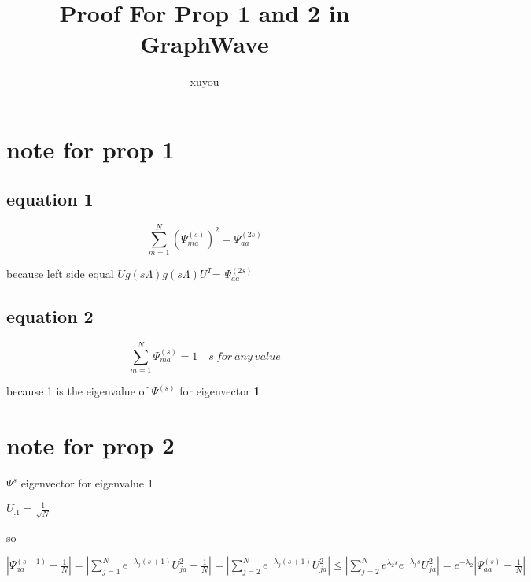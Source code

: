 \documentclass{article}
\author{xuyou}
\title{Proof For Prop 1 and 2 in GraphWave}
\begin{document}
\maketitle
\section{note for prop 1} 
\subsection{equation 1}
\begin{center}
\[
\sum _ { m=1  }^N\left( \Psi _ { m a } ^ { ( s ) } \right) ^ { 2 }
=\Psi_{aa}^{(2s)}
\]
\end{center}
because left side equal $Ug(s\Lambda)g(s\Lambda)U^T$=
$\Psi_{aa}^{(2s)}$
\subsection{equation 2}
\begin{center}

\[
\sum_{m=1}^N \Psi_{ma}^{(s)}=1 \quad s\ for\ any\ value
\]
\end{center}
because 1 is the eigenvalue of $\Psi^{(s)}$ for eigenvector \textbf{1}
\section{note for prop 2} 
$\Psi^s$ eigenvector for eigenvalue 1
\begin{center}
$U_{.1}=\frac{1}{\sqrt{N}}$
\end{center}
so\begin{center}
$\left|\Psi_{aa}^{(s+1)}-\frac{1}{N}\right|=\left|\sum_{j=1}^Ne^{-\lambda_j(s+1)}U_{ja}^2-\frac{1}{N}\right|=\left| \sum _ { j = 2 } ^ { N } e ^ { - \lambda _ { j } ( s + 1 ) } U _ { j a } ^ { 2 } \right|\leq
\left| \sum _ { j = 2 } ^ { N }e^{\lambda_2s} e ^ { - \lambda _ { j } s  } U _ { j a } ^ { 2 } \right|=e ^ { - \lambda _ { 2 } } \left| \Psi _ { a a } ^ { ( s ) } - \frac { 1 } { N } \right|$

\end{center} 
\end{document}
